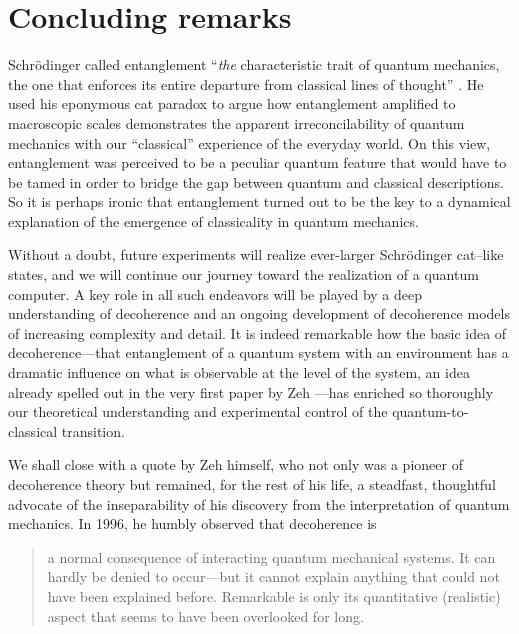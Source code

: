 \documentclass[3p,sort&compress,12pt]{elsarticle}
\begin{document}
\section{\label{sec:concluding-remarks}Concluding remarks}

Schr\"odinger called entanglement ``\emph{the} characteristic trait of quantum mechanics, the one that enforces its entire departure from classical lines of thought'' \cite[p.~555]{Schrodinger:1935:jn}. He used his eponymous cat paradox to argue how entanglement amplified to macroscopic scales demonstrates the apparent irreconcilability of quantum mechanics with our ``classical'' experience of the everyday world. On this view, entanglement was perceived to be a peculiar quantum feature that would have to be tamed in order to bridge the gap between quantum and classical descriptions. So it is perhaps ironic that entanglement turned out to be the key to a dynamical explanation of the emergence of classicality in quantum mechanics. 

Without a doubt, future experiments will realize ever-larger Schr\"odinger cat--like states, and we will continue our journey toward the realization of a quantum computer. A key role in all such endeavors will be played by a deep understanding of decoherence and an ongoing development of decoherence models of increasing complexity and detail. It is indeed remarkable how the basic idea of decoherence---that entanglement of a quantum system with an environment has a dramatic influence on what is observable at the level of the system, an idea already spelled out in the very first paper by Zeh \cite{Zeh:1970:yt}---has enriched so thoroughly our theoretical understanding and experimental control of the quantum-to-classical transition. 

We shall close with a quote by Zeh himself, who not only was a pioneer of decoherence theory but remained, for the rest of his life, a steadfast, thoughtful advocate of the inseparability of his discovery from the interpretation of quantum mechanics. In 1996, he humbly observed \cite{Zeh:1996:gy} that decoherence is 
%
\begin{quote}
a normal consequence of interacting quantum mechanical systems. It can hardly be denied to occur---but it cannot explain anything that could not have been explained before. Remarkable is only its quantitative (realistic) aspect that seems to have been overlooked for long. 
\end{quote}
%

\section*{}
\end{document}
